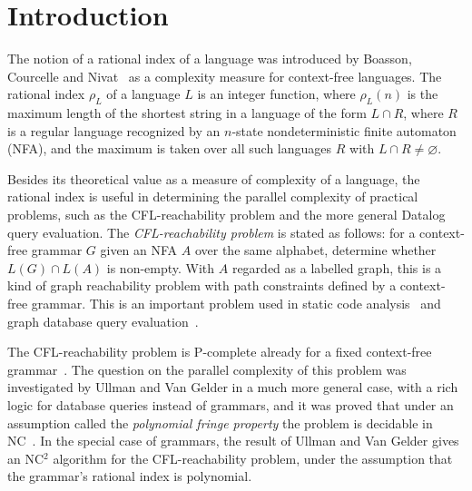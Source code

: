 \documentclass[runningheads]{llncs}
\renewcommand{\emptyset}{\varnothing}
\begin{document}
\section{Introduction}\label{section_introduction}

The notion of a rational index of a language
was introduced by Boasson, Courcelle and Nivat~\cite{RatBasic}
as a complexity measure for context-free languages.
The rational index $\rho_L$ of a language $L$ is an integer function,
where $\rho_L(n)$ is the maximum length of the shortest string in a language of the form $L \cap R$,
where $R$ is a regular language recognized by an $n$-state nondeterministic finite automaton (NFA),
and the maximum is taken over all such languages $R$ with $L \cap R \neq \emptyset$.

Besides its theoretical value as a measure of complexity of a language,
the rational index is useful
in determining the parallel complexity of practical problems,
such as the CFL-reachability problem
and the more general Datalog query evaluation.
The \emph{CFL-reachability problem} is stated as follows:
for a context-free grammar $G$
given an NFA $A$ over the same alphabet,
determine whether $L(G) \cap L(A)$ is non-empty.
With $A$ regarded as a labelled graph,
this is a kind of graph reachability problem
with path constraints defined by a context-free grammar.
This is an important problem used in static code analysis~\cite{RepsBasic}
and graph database query evaluation~\cite{Yannakakis}.

The CFL-reachability problem is P-complete
already for a fixed context-free grammar~\cite{PCompl}.
The question on the parallel complexity of this problem
was investigated by Ullman and Van Gelder \cite{Ullman}
in a much more general case,
with a rich logic for database queries instead of grammars,
and it was proved that under
an assumption called the \emph{polynomial fringe property}
the problem is decidable in NC~\cite{Ullman}.
In the special case of grammars,
the result of Ullman and Van Gelder \cite{Ullman}
gives an NC$^2$ algorithm for the CFL-reachability problem,
under the assumption that the grammar's rational index is polynomial.
\end{document}
